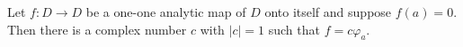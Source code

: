Let $f: D \rightarrow D$ be a one-one analytic map of $D$ onto itself and suppose $f(a) = 0$. Then there is a complex number $c$ with $|c| = 1$ such that $f = c\varphi_a$.